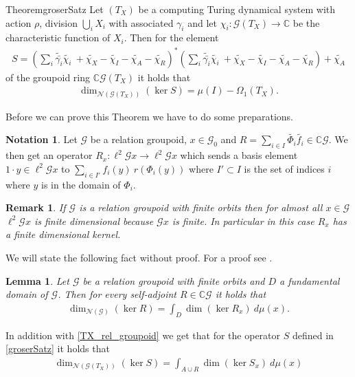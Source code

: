 \documentclass[12pt,a4paper]{scrartcl}
\theoremstyle{plain}
\newtheorem{Lemma}[Theorem]{Lemma}
\newtheorem{Remark}[Theorem]{Remark}
\theoremstyle{definition}
\newtheorem{Notation}[Theorem]{Notation}
\newcommand{\C}{\mathbb{C}} %
\newcommand{\2}{\mathbb{Z} / 2 \mathbb{Z}}
\newcommand{\G}{\mathcal{G}}
\newcommand{\1}{\bar{1}}
\newcommand{\0}{\bar{0}}
\begin{document}
\begin{restatable}{Theorem}{groserSatz} \label{groserSatz}
	Let $(T_X)$ be a computing Turing dynamical system with action $\rho$, division $\bigcup_i X_i$ with associated $\gamma_i$ and let $\chi_i \colon\G(T_X) \to \C$ be the characteristic function of $X_i$. Then for the element
	\begin{align*}
		S = (\sum_{i} \widetilde{\bar{\gamma_i}} \widetilde{\chi_i} \ + \widetilde{\chi_X} - \widetilde{\chi_I} - \widetilde{\chi_A} - \widetilde{\chi_R})^*(\sum_{i} \widetilde{\bar{\gamma_i}} \widetilde{\chi_i} \ + \widetilde{\chi_X} - \widetilde{\chi_I} - \widetilde{\chi_A} - \widetilde{\chi_R}) + \widetilde{\chi_A}
	\end{align*}
	of the groupoid ring $\C \G(T_X)$ it holds that
	\begin{align*}
		\dim_{\mathcal{N}(\G(T_X))}(\ker S) = \mu(I) - \Omega_1(T_X).
	\end{align*}
\end{restatable}
Before we can prove this Theorem we have to do some preparations. 
\begin{Notation}
	Let $\G$ be a relation groupoid, $x \in \G_0$ and $R = \sum_{i \in I} \widetilde{\Phi_i} \widetilde{f_i} \in \C\G$. We then get an operator $R_x\colon\ell^2\G x \to \ell^2\G x$ which sends a basis element $1 \cdot y \in \ell^2\G x$ to $\sum_{i \in I'} f_i(y) ~ r(\Phi_i(y)) $ where $I' \subset I$ is the set of indices $i$ where $y$ is in the domain of $\Phi_i$. 
\end{Notation}
\begin{Remark}
	If $\G$ is a relation groupoid with finite orbits then for almost all $x \in \G$ $\ell^2\G x$ is finite dimensional because $\G x$ is finite. In particular in this case $R_x$ has a finite dimensional kernel.
\end{Remark}
We will state the following fact without proof. For a proof see \cite[ch. 2.6]{GRAB}.
\begin{Lemma} \label{T_to_Tx}
	Let $\G$ be a relation groupoid with finite orbits and $D$ a fundamental domain of $\G$. Then for every self-adjoint $R \in \C \G$ it holds that
	\begin{align*}
		\dim_{\mathcal{N}(\G)}(\ker R) = \int_D \dim (\ker R_x) \ d \mu (x).
	\end{align*} 
\end{Lemma}
In addition with \ref{TX_rel_groupoid} we get that for the operator $S$ defined in \ref{groserSatz} it holds that
\begin{align*}
	\dim_{\mathcal{N}(\G(T_X))}(\ker S) = \int_{A \cup R} \dim (\ker S_x) \ d \mu (x)
\end{align*}
\end{document}
